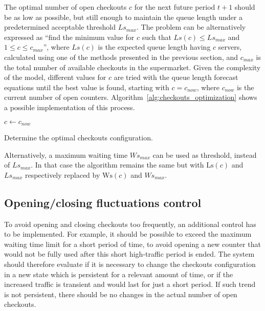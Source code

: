 The optimal number of open checkouts \( c \) for the next future period \( t+1 \) should be as low as possible, but still enough to maintain the queue length under a predetermined acceptable threshold \( Ls_{max} \). The problem can be alternatively expressed as “find the minimum value for \( c \) such that \( Ls(c) \leq Ls_{max} \) and \( 1 \leq c \leq c_{max} \)”, where \( Ls(c) \) is the expected queue length having \( c \) servers, calculated using one of the methods presented in the previous section, and \( c_{max} \) is the total number of available checkouts in the supermarket. Given the complexity of the model, different values for \( c \) are tried with the queue length forecast equations until the best value is found, starting with \( c = c_{now} \), where \( c_{now} \) is the current number of open counters. Algorithm~\ref{alg:checkouts_optimization} shows a possible implementation of this process.
\begin{algorithm}
   \;
  $ c \gets c_{now}$\;
  \caption{\label{alg:checkouts_optimization}Determine the optimal checkouts configuration.}
\end{algorithm}

Alternatively, a maximum waiting time \( Ws_{max} \) can be used as threshold, instead of \( Ls_{max} \). In that case the algorithm remains the same but with \( \text{Ls}(c) \) and \( Ls_{max} \) respectively replaced by \( \text{Ws}(c) \) and \( Ws_{max} \).

\subsection{Opening/closing fluctuations control}
\label{subsec:opening_closing_fluctuations_control}

To avoid opening and closing checkouts too frequently, an additional control has to be implemented. For example, it should be possible to exceed the maximum waiting time limit for a short period of time, to avoid opening a new counter that would not be fully used after this short high-traffic period is ended. The system should therefore evaluate if it is necessary to change the checkouts configuration in a new state which is persistent for a relevant amount of time, or if the increased traffic is transient and would last for just a short period. If such trend is not persistent, there should be no changes in the actual number of open checkouts.

